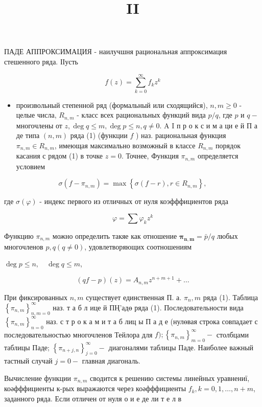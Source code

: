 \documentclass[10pt]{article}
\title{II }
\author{}
\date{}
\begin{document}
\maketitle
ПАДЕ АППРОКСИМАЦИЯ - наилучшня рациональная аппроксимация стешенного ряда. ІІусть

\[
f(z)=\sum_{k=0}^{\infty} f_{k} z^{k}
\]

\begin{itemize}
  \item произвольный степенной ряд (формальный или сходящийся), $n, m \geqslant 0$ - целые числа, $R_{n, m}$ - класс всех рациональных функций вида $p / q$, где $p$ и $q-$ многочлены от $z, \operatorname{deg} q \leqslant m, \operatorname{deg} p \leqslant n, q \neq 0$. A I п р о к с и м а ци е й П а де типа $(n, m)$ ряда (1) (функции $f$ ) наз. рациональная функция $\pi_{n, m} \in R_{n, m}$, имеющая максимально возможный в классе $R_{n, m}$ порядок касания с рядом (1) в точке $z=0$. Точнее, Функция $\pi_{n, m}$ определяется условием
\end{itemize}

\[
\sigma\left(f-\pi_{n, m}\right)=\max \left\{\sigma(f-r), r \in R_{n, m}\right\},
\]

где $\sigma(\varphi)$ - индекс первого из отличных от нуля коэфффициентов ряда

\[
\varphi=\sum \varphi_{k} z^{k}
\]

Функцию $\pi_{n, m}$ можно определить такяе как отношение $\boldsymbol{\pi}_{\boldsymbol{n}, \boldsymbol{m}}=\bar{p} / q$ любых многочленов $p, q(q \neq 0)$, удовлетворяющих соотношениям

$\operatorname{deg} p \leqslant n, \quad \operatorname{deg} q \leqslant m$,

\[
(q f-p)(z)=A_{n, m} z^{n+m+1}+\ldots
\]

При фиксированных $n, m$ существует единственная П. а. $\pi_{n}, m$ ряда (1). Таблица $\left\{\pi_{n, m}\right\}_{n, m=0}^{\infty}$ наз. т а б л ице й ПҢ'адө ряда (1). Последовательности вида $\left\{\pi_{n, m}\right\}_{n=0}^{\infty}$ наз. с т р о к а м и т а б лиц ы П а д е (нулөвая строка совпадает с последовательностью многочленов Тейлора для $f) ;\left\{\pi_{n, m}\right\}_{m=0}^{\infty}-$ столбцами таблицы Паде; $\left\{\pi_{n+j, n}\right\}_{j=0}^{\infty}-$ диагоналями таблицы Паде. Наиболее важный тастный случай $j=0-$ главная диагональ.

Вычисление функции $\pi_{n, m}$ сводится $к$ решению системы линейных уравнениї, коәфффициенты к-рых выражаются через коәфффициенты $f_{k}, k=0,1, \ldots, n+m$, заданного ряда. Если отличен от нуля о и е де ли т е л в
\end{document}
